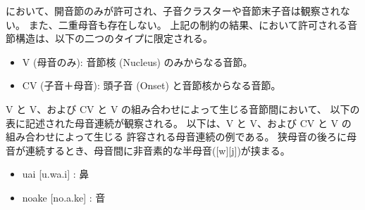 \langname において、開音節のみが許可され、子音クラスターや音節末子音は観察されない。
また、二重母音も存在しない。
上記の制約の結果、\langname において許可される音節構造は、以下の二つのタイプに限定される。

\begin{itemize}
    \item {V (母音のみ)}: 音節核 (Nucleus) のみからなる音節。
    \item {CV (子音＋母音)}: 頭子音 (Onset) と音節核からなる音節。
\end{itemize}

{V} と {V}、および {CV} と {V} の組み合わせによって生じる音節間において、
以下の表に記述された母音連続が観察される。
以下は、{V} と {V}、および {CV} と {V} の組み合わせによって生じる
許容される母音連続の例である。
狭母音の後ろに母音が連続するとき、母音間に非音素的な半母音([w][j])が挟まる。
\begin{itemize}
    \item uai [u.wa.i] : 鼻
    \item noake [no.a.ke] : 音
\end{itemize}